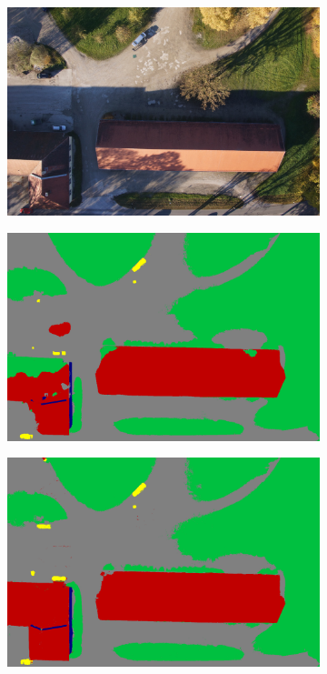 \begin{figure}[htb]
\begin{subfigure}{0.32\columnwidth}
  \centering
  \includegraphics[width=1\linewidth]{fig/segmentation/DSC00958.JPG}

\end{subfigure}
\begin{subfigure}{0.32\columnwidth}
  \centering
  \includegraphics[width=1\linewidth]{fig/segmentation/DSC00958_manual.png}

\end{subfigure}
\begin{subfigure}{0.32\columnwidth}
  \centering
  \includegraphics[width=1\linewidth]{fig/segmentation/DSC00958_auto.png}


\end{subfigure}
\end{figure}
